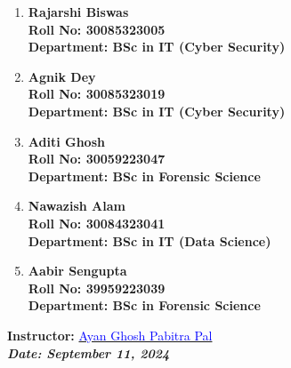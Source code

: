 \documentclass[a4paper,12pt]{article}
\begin{document}
\begin{titlepage}
    \normalsize
    \begin{enumerate}
        \item \textbf{Rajarshi Biswas}\\
              \textbf{Roll No: 30085323005}\\
              \textbf{Department: BSc in IT (Cyber Security)}
        \item \textbf{Agnik Dey}\\
              \textbf{Roll No: 30085323019}\\
              \textbf{Department: BSc in IT (Cyber Security)}
        \item \textbf{Aditi Ghosh}\\
              \textbf{Roll No: 30059223047}\\
              \textbf{Department: BSc in Forensic Science}
        \item \textbf{Nawazish Alam}\\
              \textbf{Roll No: 30084323041}\\
              \textbf{Department: BSc in IT (Data Science)}
              \item \textbf{Aabir Sengupta}\\
              \textbf{Roll No: 39959223039}\\
              \textbf{Department: BSc in Forensic Science}
    \end{enumerate}
    \vspace{0.3 cm}
    
    \textbf{Instructor:} \href{mailto:ayan.ghosh@university.edu}{\textcolor{blue}{Ayan Ghosh \text{\&} Pabitra Pal}}\\
    \textbf{\textit{Date: September 11, 2024}}

\end{titlepage}

\newpage
{}
\vspace{-2cm}
\centering
\end{document}
